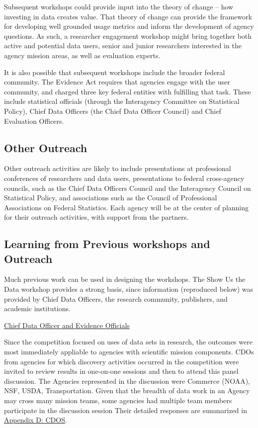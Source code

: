 \documentclass[titlepage, 11pt]{article}
\begin{document}
{Subsequent workshops could provide input into the theory of change – how investing in data creates value. That theory of change can provide the framework for developing well grounded usage metrics and inform the development of agency questions.  As such, a researcher engagement workshop might bring together both active and potential data users, senior and junior researchers interested in the agency mission areas, as well as evaluation experts.

It is also possible that subsequent workshops include the broader federal community. The Evidence Act requires that agencies engage with the user community, and charged three key federal entities with fulfilling that task.  These include statistical officials (through the Interagency Committee on Statistical Policy), Chief Data Officers (the Chief Data Officer Council) and Chief Evaluation Officers.  

\subsection{Other Outreach}
Other outreach activities are likely to include presentations at professional conferences of researchers and data users, presentations to federal cross-agency councils, such as the Chief Data Officers Council and the Interagency Council on Statistical Policy, and associations such as the Council of Professional Associations on Federal Statistics.  Each agency will be at the center of planning for their outreach activities, with support from the partners. 

\subsection{Learning from Previous workshops and Outreach}
Much previous work can be used in designing the workshops. The Show Us the Data workshop provides a strong basis, since information (reproduced below) was provided by Chief Data Officers, the research community, publishers, and academic institutions.

\href{https://coleridgeinitiative.org/show-us-the-data/stakeholder-questions/#federal-agencies}{Chief Data Officer and Evidence Officials}

Since the competition focused on uses of data sets in research, the outcomes were most immediately appliable to agencies with scientific mission components. CDOs from agencies for which discovery activities occurred in the competition were invited to review results in one-on-one sessions and then to attend this panel discussion.  The Agencies represented in the discussion were Commerce (NOAA), NSF, USDA, Transportation.   Given that the breadth of data work in an Agency may cross many mission teams, some agencies had multiple team members participate in the discussion session Their detailed responses are summarized in \hyperref[subsec:CDOE]{Appendix D: CDOS}.

}
\end{document}
